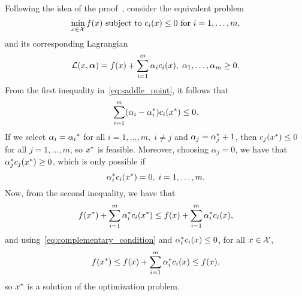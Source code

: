 
Following the idea of the proof~\citep{ScholkopfS02}, consider the equivalent problem
    \begin{equation}
        \nonumber
        \min_{x \in \mathcal{X}} f(x) \text{ subject to } c_i(x) \leq 0 \text{ for } i=1, \ldots, m ,
    \end{equation}
and its corresponding Lagrangian
\begin{equation}
    \nonumber
    \mathcal{L}(x, \bm{\alpha}) = f(x) + \sum_{i=1}^m \alpha_i c_i(x) , \; \alpha_1, \ldots, \alpha_m \geq 0 .
\end{equation}
From the first inequality in~\eqref{eq:saddle_point}, it follows that 
$$ \sum_{i=1}^m (\alpha_i- {\alpha}^*_i) c_i({x}^*) \leq 0 .$$
If we select $\alpha_i = {\alpha_i}^*$ for all $i=1, \ldots, m,\; i \neq j$ and $\alpha_{j} = {\alpha}^*_{j} + 1$, then
$c_j({x}^*) \leq 0$ for all $j=1, \ldots, m$, so ${x}^*$ is feasible.
%
Moreover, choosing $\alpha_{j} = 0$, we have that ${\alpha}^*_j c_j({x}^*) \geq 0$, which is only possible if 
\begin{equation}\label{eq:complementary_condition}
    \opt{\alpha}_i c_i(\opt{x}) = 0 , \; i=1, \ldots, m .
\end{equation}
Now, from the second inequality, we have that
\begin{equation}
    \nonumber
    f({x}^*) + \sum_{i=1}^m {\alpha}^*_i c_i({x}^*) \leq f(x) + \sum_{i=1}^m {\alpha}^*_i c_i(x) ,
\end{equation}
and using~\eqref{eq:complementary_condition} and ${\alpha}^*_i c_i(x) \leq 0$, for all $x \in \mathcal{X}$,
\begin{equation}
    \nonumber
    f({x}^*) \leq f(x) + \sum_{i=1}^m {\alpha}^*_i c_i(x) \leq f(x) ,
\end{equation}
so ${x}^*$ is a solution of the optimization problem.

